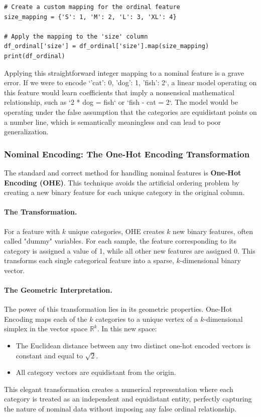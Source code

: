 \begin{itemize}
\begin{verbatim}
# Create a custom mapping for the ordinal feature
size_mapping = {'S': 1, 'M': 2, 'L': 3, 'XL': 4}

# Apply the mapping to the 'size' column
df_ordinal['size'] = df_ordinal['size'].map(size_mapping)
print(df_ordinal)
\end{verbatim}

\begin{remark}
Applying this straightforward integer mapping to a nominal feature is a grave error. If we were to encode `{'cat': 0, 'dog': 1, 'fish': 2}`, a linear model operating on this feature would learn coefficients that imply a nonsensical mathematical relationship, such as `2 * dog = fish` or `fish - cat = 2`. The model would be operating under the false assumption that the categories are equidistant points on a number line, which is semantically meaningless and can lead to poor generalization.
\end{remark}

\subsubsection{Nominal Encoding: The One-Hot Encoding Transformation}
The standard and correct method for handling nominal features is \textbf{One-Hot Encoding (OHE)}. This technique avoids the artificial ordering problem by creating a new binary feature for each unique category in the original column.

\paragraph{The Transformation.} For a feature with $k$ unique categories, OHE creates $k$ new binary features, often called "dummy" variables. For each sample, the feature corresponding to its category is assigned a value of 1, while all other new features are assigned 0. This transforms each single categorical feature into a sparse, $k$-dimensional binary vector.

\paragraph{The Geometric Interpretation.} The power of this transformation lies in its geometric properties. One-Hot Encoding maps each of the $k$ categories to a unique vertex of a $k$-dimensional simplex in the vector space $\mathbb{R}^k$. In this new space:
\begin{itemize}
    \item The Euclidean distance between any two distinct one-hot encoded vectors is constant and equal to $\sqrt{2}$.
    \item All category vectors are equidistant from the origin.
\end{itemize}
This elegant transformation creates a numerical representation where each category is treated as an independent and equidistant entity, perfectly capturing the nature of nominal data without imposing any false ordinal relationship.


\end{itemize}
